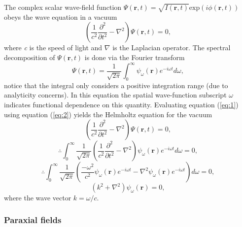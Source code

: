 \documentclass[10pt, a4paper, singlespacing]{report}
\begin{document}
The complex scalar wave-field function $\Psi(\mathbf{r},t) = \sqrt{I(\mathbf{r},t)} \mathrm{exp}(i \phi(\mathbf{r},t))$ obeys the wave equation in a vacuum
\begin{equation}\label{eq:1}
\left ( \frac{1}{c^2} \frac{\partial^2 }{\partial t^2} -\nabla^2 \right ) \Psi(\mathbf{r},t) = 0,
\end{equation} 
where \textit{c} is the speed of light and $\nabla$ is the Laplacian operator.
The spectral decomposition of $\Psi(\mathbf{r},t)$ is done via the Fourier transform
\begin{equation}\label{eq:2}
\Psi(\mathbf{r},t) = \frac{1}{\sqrt{2 \pi}} \int_{0}^{\infty}\psi_{\omega}(\mathbf{r}) e^{-i\omega t}d\omega,
\end{equation}
notice that the integral only considers a positive integration range (due to analyticity concerns\cite{PagsTutes}). In this equation the spatial wave-function subscript $\omega$ indicates functional dependence on this quantity\cite{Pags2006}. Evaluating equation (\ref{eq:1}) using equation (\ref{eq:2}) yields the Helmholtz equation for the vacuum
\begin{equation}\label{eq:3}
\left ( \frac{1}{c^2}\frac{\partial^2}{\partial t^{2}} - \nabla^{2}  \right )\Psi(\mathbf{r},t) = 0,
\end{equation}
\begin{equation}\label{eq:4}
\therefore \int_{0}^{\infty} \frac{1}{\sqrt{2 \pi}} \left ( \frac{1}{c^2}\frac{\partial^2}{\partial t^{2}} -\nabla^{2}  \right )  
\psi_{\omega}(\mathbf{r}) e^{-i\omega t}d\omega = 0,
\end{equation}
\begin{equation}\label{eq:5}
\therefore \int_{0}^{\infty} \frac{1}{\sqrt{2 \pi}} \left ( \frac{-\omega^2}{c^2}\psi_{\omega}(\mathbf{r}) e^{-i\omega t} -\nabla^{2}\psi_{\omega}(\mathbf{r}) e^{-i\omega t} \right ) d\omega  
 = 0,
\end{equation}
\begin{equation}\label{eq:6}
\left ( k^2 + \nabla^{2} \right ) \psi_{\omega}(\mathbf{r})  
 = 0,
\end{equation}
where the wave vector $k = \omega/c$.

\subsubsection{Paraxial fields}\label{Paraxial}
\end{document}
